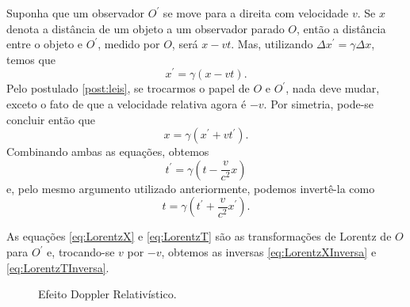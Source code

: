 Suponha que um observador $O^\prime$ se move para a direita com velocidade $v$. Se $x$ denota a distância de um objeto a um observador parado $O$, então a distância entre o objeto e $O^\prime$, medido por $O$, será $x-vt$. Mas, utilizando $\Delta x^\prime = \gamma \Delta x$, temos que
\begin{equation}\label{eq:LorentzX}
    x^\prime = \gamma (x-vt).
\end{equation}
Pelo postulado \ref{post:leis}, se trocarmos o papel de $O$ e $O^\prime$, nada deve mudar, exceto o fato de que a velocidade relativa agora é $-v$. Por simetria, pode-se concluir então que
\begin{equation}\label{eq:LorentzXInversa}
    x = \gamma (x^\prime + vt^\prime) .
\end{equation}
Combinando ambas as equações, obtemos
\begin{equation}\label{eq:LorentzT}
    t^\prime = \gamma \left(t - \frac{v}{c^2}x\right)
\end{equation}
e, pelo mesmo argumento utilizado anteriormente, podemos invertê-la como
\begin{equation}\label{eq:LorentzTInversa}
    t = \gamma \left(t^\prime + \frac{v}{c^2}x^\prime\right) .
\end{equation}

As equações \eqref{eq:LorentzX} e \eqref{eq:LorentzT} são as transformações de Lorentz de $O$ para $O^\prime$ e, trocando-se $v$ por $-v$, obtemos as inversas \eqref{eq:LorentzXInversa} e \eqref{eq:LorentzTInversa}.

 
\begin{figure}[th]
    \centering
    \caption{Efeito Doppler Relativístico.}
    \label{fig:doppler}
\end{figure}

